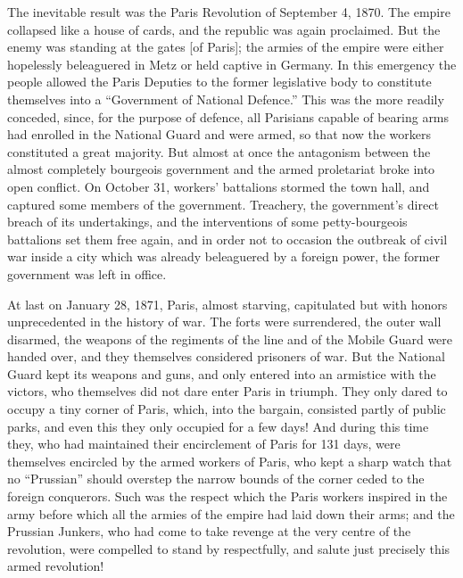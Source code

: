 \documentclass{book}
\begin{document}
The inevitable result was the Paris Revolution of September 4, 1870. The
empire collapsed like a house of cards, and the republic was again
proclaimed. But the enemy was standing at the gates [of Paris]; the armies
of the empire were either hopelessly beleaguered in Metz or held captive
in Germany. In this emergency the people allowed the Paris Deputies to the
former legislative body to constitute themselves into a “Government of
National Defence.” This was the more readily conceded, since, for the
purpose of defence, all Parisians capable of bearing arms had enrolled in
the National Guard and were armed, so that now the workers constituted
a great majority. But almost at once the antagonism between the almost
completely bourgeois government and the armed proletariat broke into open
conflict. On October 31, workers’ battalions stormed the town hall, and
captured some members of the government. Treachery, the government’s
direct breach of its undertakings, and the interventions of some
petty-bourgeois battalions set them free again, and in order not to
occasion the outbreak of civil war inside a city which was already
beleaguered by a foreign power, the former government was left in office.

At last on January 28, 1871, Paris, almost starving, capitulated but with
honors unprecedented in the history of war. The forts were surrendered,
the outer wall disarmed, the weapons of the regiments of the line and of
the Mobile Guard were handed over, and they themselves considered
prisoners of war. But the National Guard kept its weapons and guns, and
only entered into an armistice with the victors, who themselves did not
dare enter Paris in triumph. They only dared to occupy a tiny corner of
Paris, which, into the bargain, consisted partly of public parks, and even
this they only occupied for a few days! And during this time they, who had
maintained their encirclement of Paris for 131 days, were themselves
encircled by the armed workers of Paris, who kept a sharp watch that no
“Prussian” should overstep the narrow bounds of the corner ceded to the
foreign conquerors. Such was the respect which the Paris workers inspired
in the army before which all the armies of the empire had laid down their
arms; and the Prussian Junkers, who had come to take revenge at the very
centre of the revolution, were compelled to stand by respectfully, and
salute just precisely this armed revolution!
\end{document}

